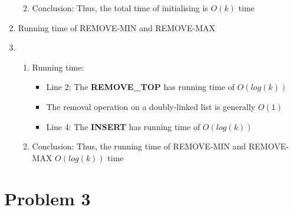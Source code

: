 \documentclass{article}
\begin{document}
\begin{enumerate}
\begin{enumerate}
\begin{itemize}
			\end{itemize}
			\item Conclusion: Thus, the total time of initialising is \(O(k)\) time
		\end{enumerate}
		\item Running time of REMOVE-MIN and REMOVE-MAX
		\item \begin{enumerate}
			\item Running time:
			\begin{itemize}
				\item Line 2: The \textbf{REMOVE\_TOP} has running time of \(O(log(k))\)
				\item The removal operation on a doubly-linked list is generally \(O(1)\)
				\item Line 4: The \textbf{INSERT} has running time of \(O(log(k))\)
			\end{itemize}
			\item Conclusion: Thus, the running time of REMOVE-MIN and REMOVE-MAX \(O(log(k))\) time
		\end{enumerate}
	\end{enumerate}


	\newpage \section*{Problem 3}
\end{document}
